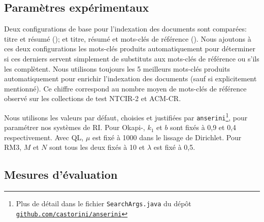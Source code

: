 %

\subsection{Paramètres expérimentaux}

Deux configurations de base pour l'indexation des documents sont comparées: titre et résumé (\trc{}); et titre, résumé et mots-clés de référence (\trmc{}).
%
Nous ajoutons à ces deux configurations les mots-clés produits automatiquement pour déterminer si ces derniers servent simplement de substituts aux mots-clés de référence ou s'ils les complètent.
%
Nous utilisons toujours les 5 meilleurs mots-clés produits automatiquement pour enrichir l'indexation des documents (sauf si explicitement mentionné).
Ce chiffre correspond au nombre moyen de mots-clés de référence observé sur les collections de test NTCIR-2 et ACM-CR.

Nous utilisons les valeurs par défaut, choisies et justifiées par \texttt{anserini}\footnote{Plus de détail dans le fichier \texttt{SearchArgs.java} du dépôt \href{https://github.com/castorini/anserini/blob/master/src/main/java/io/anserini/search/SearchArgs.java}{\texttt{github.com/castorini/anserini}}}, pour paramétrer nos systèmes de RI.
Pour Okapi-\bm{}, $k_1$ et $b$ sont fixés à 0,9 et 0,4 respectivement.
Avec QL, $\mu$ est fixé à \num{1000} dans le lissage de Dirichlet.
Pour RM3, $M$ et $N$ sont tous les deux fixés à 10 et $\lambda$ est fixé à 0,5.


\subsection{Mesures d'évaluation}

